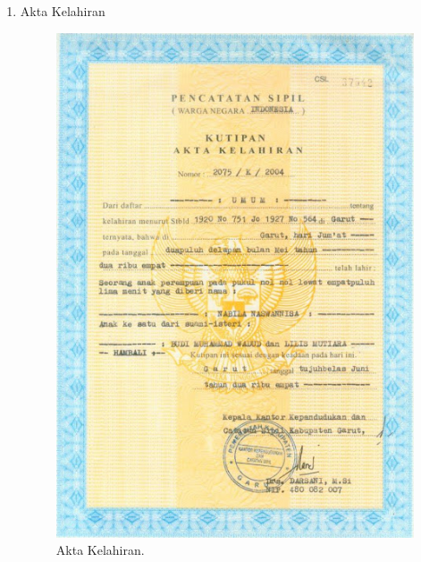 \begin{enumerate}
	\item Akta Kelahiran
	\begin{figure}[H]
		\centering
		\includegraphics[width=12cm]{figures/akta.jpg}
		\caption{Akta Kelahiran.}	
	\end{figure}


\end{enumerate}
